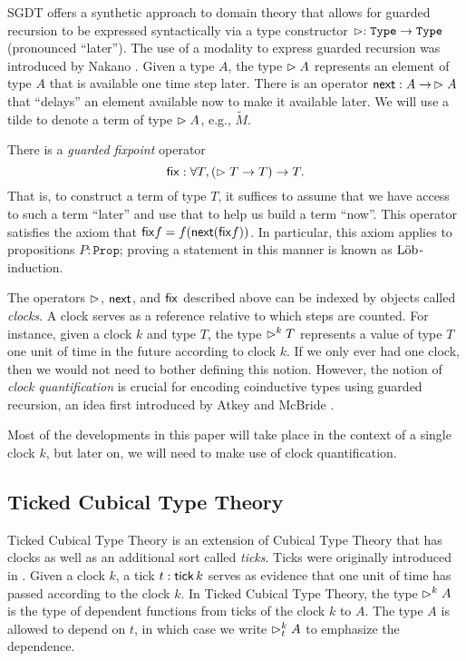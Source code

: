 SGDT offers a synthetic approach to domain theory that allows for guarded recursion
to be expressed syntactically via a type constructor $\vartriangleright : \texttt{Type} \to \texttt{Type}$ 
(pronounced ``later''). The use of a modality to express guarded recursion
was introduced by Nakano \cite{Nakano2000}.
%
Given a type $A$, the type $\vartriangleright A$ represents an element of type $A$
that is available one time step later. There is an operator $\mathsf{next} : A \to\, \vartriangleright A$
that ``delays'' an element available now to make it available later.
We will use a tilde to denote a term of type $\vartriangleright A$, e.g., $\tilde{M}$.


There is a \emph{guarded fixpoint} operator
%
\[
  \mathsf{fix} : \forall T, (\vartriangleright T \to T) \to T.
\]
%
That is, to construct a term of type $T$, it suffices to assume that we have access to
such a term ``later'' and use that to help us build a term ``now''.
This operator satisfies the axiom that $\mathsf{fix} f = f (\mathsf{next} (\mathsf{fix} f))$.
In particular, this axiom applies to propositions $P : \texttt{Prop}$; proving
a statement in this manner is known as $\text{L\"{o}b}$-induction.

The operators $\vartriangleright$, $\mathsf{next}$, and $\mathsf{fix}$ described above can be indexed by objects
called \emph{clocks}. A clock serves as a reference relative to which steps are counted.
For instance, given a clock $k$ and type $T$, the type $\vartriangleright^k T$ represents a value of type
$T$ one unit of time in the future according to clock $k$.
If we only ever had one clock, then we would not need to bother defining this notion.
However, the notion of \emph{clock quantification} is crucial for encoding coinductive types using guarded
recursion, an idea first introduced by Atkey and McBride \cite{atkey-mcbride2013}.

Most of the developments in this paper will take place in the context of a single clock $k$,
but later on, we will need to make use of clock quantification.

\subsection{Ticked Cubical Type Theory}

Ticked Cubical Type Theory \cite{mogelberg-veltri2019} is an extension of
Cubical Type Theory \cite{CohenCoquandHuberMortberg2017} that has clocks as well
as an additional sort called \emph{ticks}. Ticks were originally introduced in
\cite{bahr-grathwohl-bugge-mogelberg2017}. Given a clock $k$, a tick $t :
\mathsf{tick}\, k$ serves as evidence that one unit of time has passed according to the
clock $k$. In Ticked Cubical Type Theory, the type $\vartriangleright^k A$ is the type of
dependent functions from ticks of the clock $k$ to $A$. The type $A$ is allowed
to depend on $t$, in which case we write $\vartriangleright^k_t A$ to emphasize the
dependence.

